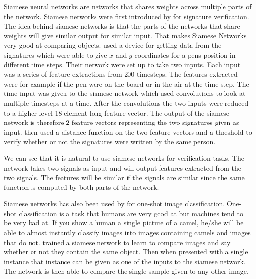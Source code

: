 Siamese neural networks are networks that shares weights across multiple parts
of the network. Siamese networks were first introduced by \citet{NIPS1993_769}
for signature verification. The idea behind siamese networks is that the parts
of the networks that share weights will give similar output for similar input.
That makes Siamese Networks very good at comparing objects. \citet{NIPS1993_769}
used a device for getting data from the signatures which were able to give $x$
and $y$ coordinates for a pens position in different time steps. Their network
were set up to take two inputs. Each input was a series of feature extractions
from 200 timesteps. The features extracted were for example if the pen were
on the board or in the air at the time step. The time input was given to the
siamese network which used convolutions to look at multiple timesteps at a time.
After the convolutions the two inputs were reduced to a higher level 18 element
long feature vector. The output of the siamese network is therefore 2 feature
vectors representing the two signatures given as input. \citet{NIPS1993_769}
then used a distance function on the two feature vectors and a threshold to
verify whether or not the signatures were written by the same person.

We can see that it is natural to use siamese networks for verification tasks.
The network takes two signals as input and will output features extracted from
the two signals. The features will be similar if the signals are similar since
the same function is computed by both parts of the network.

Siamese networks has also been used by \citet{Koch2015SiameseNN} for one-shot
image classification. One-shot classification is a task that humans are very
good at but machines tend to be very bad at. If you show a human a single
picture of a camel, he/she will be able to almost instantly classify images
into images containing camels and images that do not. \citet{Koch2015SiameseNN}
trained a siamese network to learn to compare images and say whether or not
they contain the same object. Then when presented with a single instance that
instance can be given as one of the inputs to the siamese network. The network
is then able to compare the single sample given to any other image.

